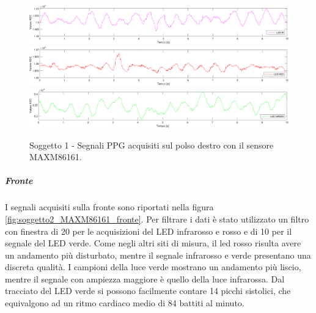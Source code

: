 \begin{figure}[h]
	\centering
	\includegraphics[width=1\linewidth]{ImageFiles/Misure Preliminari/Soggetto 1/MAXM86161/polso_ired}
	\includegraphics[width=1\linewidth]{ImageFiles/Misure Preliminari/Soggetto 1/MAXM86161/polso_red}
	\includegraphics[width=1\linewidth]{ImageFiles/Misure Preliminari/Soggetto 1/MAXM86161/polso_green}
	\caption{Soggetto 1 - Segnali PPG acquisiti sul polso destro con il sensore MAXM86161.}
	\label{fig:soggetto1_MAXM86161_polso}
\end{figure}

\clearpage

\subparagraph{Fronte}

I segnali acquisiti sulla fronte sono riportati nella figura \ref{fig:soggetto2_MAXM86161_fronte}. Per filtrare i dati è stato utilizzato un filtro con finestra di 20 per le acquisizioni del LED infrarosso e rosso e di 10 per il segnale del LED verde. Come negli altri siti di misura, il led rosso risulta avere un andamento più disturbato, mentre il segnale infrarosso e verde presentano una discreta qualità. I campioni della luce verde mostrano un andamento più liscio, mentre il segnale con ampiezza maggiore è quello della luce infrarossa. Dal tracciato del LED verde si possono facilmente contare 14 picchi sistolici, che equivalgono ad un ritmo cardiaco medio di 84 battiti al minuto.

